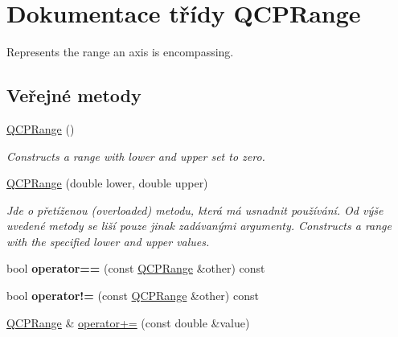 \hypertarget{classQCPRange}{}\section{Dokumentace třídy Q\+C\+P\+Range}
\label{classQCPRange}


Represents the range an axis is encompassing.  


\subsection*{Veřejné metody}
\begin{DoxyCompactItemize}
\item 
\hypertarget{classQCPRange_aca158d7e69702cee5d77d10a269b01e2}{}\hyperlink{classQCPRange_aca158d7e69702cee5d77d10a269b01e2}{Q\+C\+P\+Range} ()\label{classQCPRange_aca158d7e69702cee5d77d10a269b01e2}

\begin{DoxyCompactList}\small\item\em Constructs a range with {\itshape lower} and {\itshape upper} set to zero. \end{DoxyCompactList}\item 
\hypertarget{classQCPRange_a1d9d84d084c8f368fdedd42e0978d405}{}\hyperlink{classQCPRange_a1d9d84d084c8f368fdedd42e0978d405}{Q\+C\+P\+Range} (double lower, double upper)\label{classQCPRange_a1d9d84d084c8f368fdedd42e0978d405}

\begin{DoxyCompactList}\small\item\em Jde o přetíženou (overloaded) metodu, která má usnadnit používání. Od výše uvedené metody se liší pouze jinak zadávanými argumenty. Constructs a range with the specified {\itshape lower} and {\itshape upper} values. \end{DoxyCompactList}\item 
\hypertarget{classQCPRange_aa20f91509687505e25bd2ef10d2f0e15}{}bool {\bfseries operator==} (const \hyperlink{classQCPRange}{Q\+C\+P\+Range} \&other) const \label{classQCPRange_aa20f91509687505e25bd2ef10d2f0e15}

\item 
\hypertarget{classQCPRange_a9b9016ee83dea60573abb9a5ef4cdbcb}{}bool {\bfseries operator!=} (const \hyperlink{classQCPRange}{Q\+C\+P\+Range} \&other) const \label{classQCPRange_a9b9016ee83dea60573abb9a5ef4cdbcb}

\item 
\hypertarget{classQCPRange_afea7c1aa7d08f061cd9bd8832f957df8}{}\hyperlink{classQCPRange}{Q\+C\+P\+Range} \& \hyperlink{classQCPRange_afea7c1aa7d08f061cd9bd8832f957df8}{operator+=} (const double \&value)\label{classQCPRange_afea7c1aa7d08f061cd9bd8832f957df8}


\end{DoxyCompactItemize}
